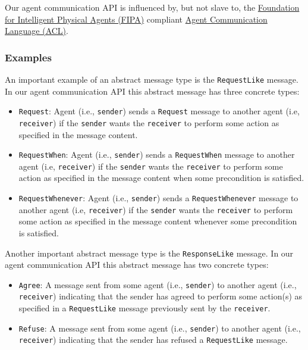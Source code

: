 \documentclass[11pt]{amsart}
\begin{document}
Our agent communication API is influenced by, but not slave to, the \href{http://www.fipa.org/}{Foundation for Intelligent Physical Agents (FIPA)} compliant \href{http://www.fipa.org/specs/fipa00037/SC00037J.pdf}{Agent Communication Language (ACL)}.

\subsubsection{Examples}
An important example of an abstract message type is the \texttt{RequestLike} message. In our agent communication API this abstract message has three concrete types:
\begin{itemize}
    \item \texttt{Request}: Agent (i.e., \texttt{sender}) sends a \texttt{Request} message to another agent (i.e, \texttt{receiver}) if the \texttt{sender} wants the \texttt{receiver} to perform some action as specified in the message content.
    \item \texttt{RequestWhen}: Agent (i.e., \texttt{sender}) sends a \texttt{RequestWhen} message to another agent (i.e, \texttt{receiver}) if the \texttt{sender} wants the \texttt{receiver} to perform some action as specified in the message content when some precondition is satisfied.
    \item \texttt{RequestWhenever}: Agent (i.e., \texttt{sender}) sends a \texttt{RequestWhenever} message to another agent (i.e, \texttt{receiver}) if the \texttt{sender} wants the \texttt{receiver} to perform some action as specified in the message content whenever some precondition is satisfied.
\end{itemize}

Another important abstract message type is the \texttt{ResponseLike} message. In our agent communication API this abstract message has two concrete types:
\begin{itemize}
    \item \texttt{Agree}: A message sent from some agent (i.e., \texttt{sender}) to another agent (i.e., \texttt{receiver}) indicating that the sender has agreed to perform some action(s) as specified in a \texttt{RequestLike} message previously sent by the \texttt{receiver}. 
    \item \texttt{Refuse}: A message sent from some agent (i.e., \texttt{sender}) to another agent (i.e., \texttt{receiver}) indicating that the sender has refused a \texttt{RequestLike} message.
\end{itemize}
\end{document}
